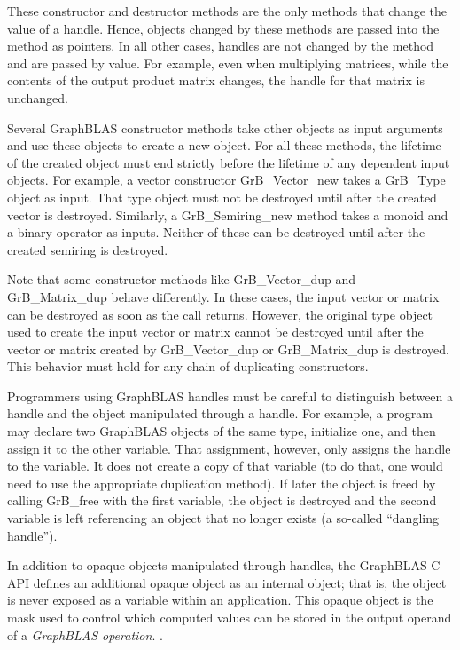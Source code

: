 These constructor and destructor methods are the only methods that change 
the value of a handle.  Hence, objects changed by these methods are passed
into the method as pointers.  In all other cases, handles are not changed by the 
method and are passed by value.  For example, even when multiplying matrices, 
while the contents of the output product matrix changes, the handle for that 
matrix is unchanged. 

Several GraphBLAS constructor methods take other objects as input arguments
and use these objects to create a new object. For all these
methods, the lifetime of the created object must end strictly before
the lifetime of any dependent input objects. For example, a vector constructor
{\sf GrB\_Vector\_new} takes a {\sf GrB\_Type} object as input. That type
object must not be destroyed until after the created vector is destroyed.
Similarly, a {\sf GrB\_Semiring\_new} method takes a monoid and
a binary operator as inputs. Neither of these can be destroyed until
after the created semiring is destroyed.

Note that some constructor methods like {\sf GrB\_Vector\_dup} and 
{\sf GrB\_Matrix\_dup} behave differently. In these cases, the input 
vector or matrix can
be destroyed as soon as the call returns. However, the original type
object used to create the input vector or matrix cannot be destroyed
until after the vector or matrix created by {\sf GrB\_Vector\_dup} or
{\sf GrB\_Matrix\_dup} is destroyed.  This behavior must hold for any
chain of duplicating constructors.

Programmers using GraphBLAS handles must be careful to distinguish between a 
handle and the object manipulated through a handle.  For example, a program may 
declare two GraphBLAS objects of the same type, initialize one, and then assign 
it to the other variable.  That assignment, however, only assigns the handle to 
the variable.  It does not create a copy of that variable (to do that, one 
would need to use the appropriate duplication method).  If later the object is 
freed by calling {\sf GrB\_free} with the first variable, the object is 
destroyed and the second variable is left referencing an object that no longer 
exists (a so-called ``dangling handle'').

In addition to opaque objects manipulated through handles, the GraphBLAS C API 
defines an additional opaque object as an internal object; that is, the object 
is never exposed as a variable within an application.  This opaque object is 
the mask used to control which computed values can be stored in the output 
operand of a \emph{GraphBLAS operation}.  .

